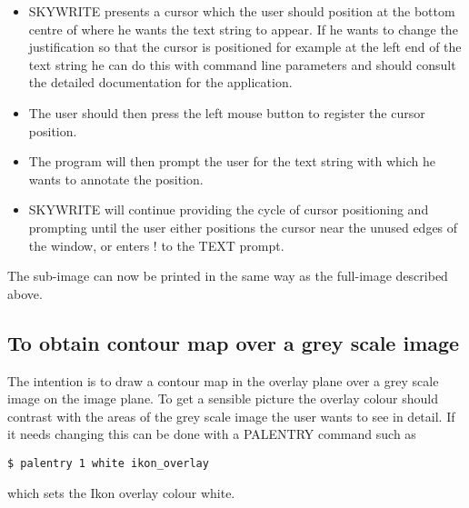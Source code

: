 \begin{itemize}
\item SKYWRITE presents a cursor which the user should position at the bottom
centre of where he wants the text string to appear. If he wants to change the
justification so that the cursor is positioned for example at the left end of
the text string he can do this with command line parameters and should consult
the detailed documentation for the application.
\item The user should then press the left mouse button to register the cursor
position.
\item The program will then prompt the user for the text string with which he
wants to annotate the position.
\item SKYWRITE will continue providing the cycle of cursor positioning and
prompting until the user either positions the cursor near the unused edges of
the window, or enters ! to the TEXT prompt.
\end{itemize}

The sub-image can now be printed in the same way as the full-image described
above.
\subsection{To obtain contour map over a grey scale image}
\label{k:contgrey}
The intention is to draw a contour map in the overlay plane over a grey scale
image on the image plane. To get a sensible picture the overlay colour should
contrast with the areas of the grey scale image the user wants to see in detail.
If it needs changing this can be done with a PALENTRY command such as
\begin{small}
\begin{verbatim}
$ palentry 1 white ikon_overlay
\end{verbatim}
\end{small}
which sets the Ikon overlay colour white.

